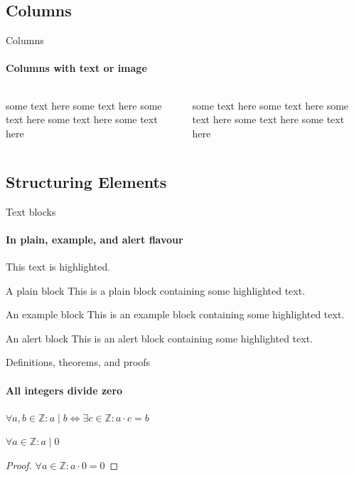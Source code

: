 \documentclass[xcolor=svgnames,10pt,aspectratio=169]{beamer}
\begin{document}
	\subsection{Columns}
    \begin{frame}[label=columns]{Columns}
      \framesubtitle{Columns with text or image}
      \begin{columns}
      \begin{column}{0.5\textwidth}
         some text here some text here some text here some text here some text here
      \end{column}
      \begin{column}{0.5\textwidth}  
           some text here some text here some text here some text here some text here
      \end{column}
      \end{columns}
    \end{frame}

    \subsection{Structuring Elements}
    \begin{frame}[label=simmonshall]{Text blocks}
      \framesubtitle{In plain, example, and \alert{alert} flavour}
      \alert{This text} is highlighted.

      \begin{block}{A plain block}
        This is a plain block containing some \alert{highlighted text}.
      \end{block}
      \begin{exampleblock}{An example block}
        This is an example block containing some \alert{highlighted text}.
      \end{exampleblock}
      \begin{alertblock}{An alert block}
        This is an alert block containing some \alert{highlighted text}.
      \end{alertblock}
    \end{frame}

    \begin{frame}[label=proof]{Definitions, theorems, and proofs}
      \framesubtitle{All integers divide zero}
      \begin{definition}
        $\forall a,b\in\mathbb{Z}: a\mid b\iff\exists c\in\mathbb{Z}:a\cdot c=b$
       
      \end{definition}
      \begin{theorem}
        $\forall a\in\mathbb{Z}: a\mid 0$
      \end{theorem}
      \begin{proof}[Proof\nopunct]
        $\forall a\in\mathbb{Z}: a\cdot 0=0$
      \end{proof}
    \end{frame}
\end{document}
